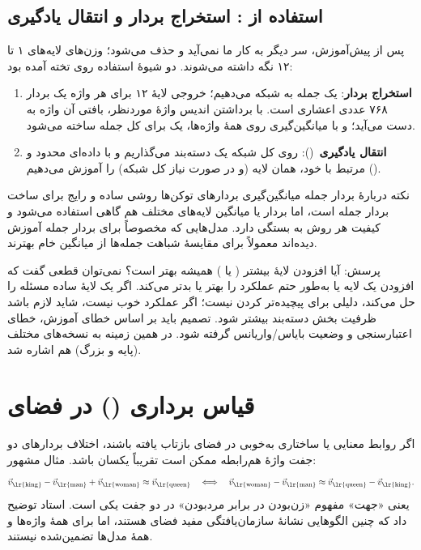 \subsection{استفاده از : استخراج بردار و انتقال یادگیری}
پس از پیش‌آموزش، سر  دیگر به کار ما نمی‌آید و حذف می‌شود؛ وزن‌های لایه‌های ۱ تا ۱۲ نگه داشته می‌شوند. دو شیوهٔ استفاده روی تخته آمده بود:
\begin{enumerate}
  \item \textbf{استخراج بردار}: یک جمله به شبکه می‌دهیم؛ خروجی لایهٔ ۱۲ برای هر واژه یک بردار ۷۶۸ عددی اعشاری است. با برداشتن اندیس واژهٔ موردنظر،  بافتی آن واژه به دست می‌آید؛ و با میانگین‌گیری روی همهٔ واژه‌ها، یک  برای کل جمله ساخته می‌شود.
  \item \textbf{انتقال یادگیری}\ (): روی کل شبکه یک دسته‌بند می‌گذاریم و با داده‌ای محدود و مرتبط با  خود، همان لایه (و در صورت نیاز کل شبکه) را آموزش می‌دهیم ().
\end{enumerate}

\begin{addedbox}{نکته دربارهٔ بردار جمله}
میانگین‌گیری بردارهای توکن‌ها روشی ساده و رایج برای ساخت بردار جمله است، اما بردار \lr{[CLS]} یا میانگین لایه‌های مختلف هم گاهی استفاده می‌شود و کیفیت هر روش به  بستگی دارد. مدل‌هایی که مخصوصاً برای بردار جمله آموزش دیده‌اند معمولاً برای مقایسهٔ شباهت جمله‌ها از میانگین خام  بهترند.
\end{addedbox}

\begin{exambox}{پرسش: آیا افزودن لایهٔ بیشتر ( یا ) همیشه بهتر است؟}
نمی‌توان قطعی گفت که افزودن یک لایه یا  به‌طور حتم عملکرد را بهتر یا بدتر می‌کند. اگر یک لایهٔ ساده مسئله را حل می‌کند، دلیلی برای پیچیده‌تر کردن نیست؛ اگر عملکرد خوب نیست، شاید لازم باشد ظرفیت بخش دسته‌بند بیشتر شود. تصمیم باید بر اساس خطای آموزش، خطای اعتبارسنجی و وضعیت بایاس/واریانس گرفته شود. در همین زمینه به نسخه‌های مختلف  (پایه و بزرگ) هم اشاره شد.
\end{exambox}

\section{قیاس برداری () در فضای }

اگر روابط معنایی یا ساختاری به‌خوبی در فضای  بازتاب یافته باشند، اختلاف بردارهای دو جفت واژهٔ هم‌رابطه ممکن است تقریباً یکسان باشد. مثال مشهور:
\[
\vec{v}_{\text{\lr{king}}}-\vec{v}_{\text{\lr{man}}}+\vec{v}_{\text{\lr{woman}}}\approx\vec{v}_{\text{\lr{queen}}}
\quad\Longleftrightarrow\quad
\vec{v}_{\text{\lr{woman}}}-\vec{v}_{\text{\lr{man}}}\approx\vec{v}_{\text{\lr{queen}}}-\vec{v}_{\text{\lr{king}}} .
\]
یعنی «جهت» مفهوم «زن‌بودن در برابر مرد‌بودن» در دو جفت یکی است. استاد توضیح داد که چنین الگوهایی نشانهٔ سازمان‌یافتگی مفید فضای  هستند، اما برای همهٔ واژه‌ها و همهٔ مدل‌ها تضمین‌شده نیستند.

